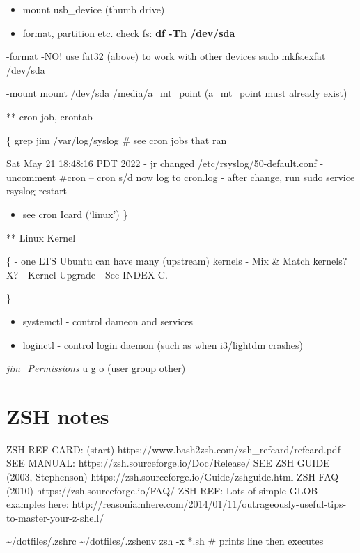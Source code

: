 \documentclass[
]{report}
\providecommand{\tightlist}{%
  \setlength{\itemsep}{0pt}\setlength{\parskip}{0pt}}\usepackage{longtable,booktabs,array}
\begin{document}
\begin{itemize}
\tightlist
\item
  mount usb\_device (thumb drive)
\item
  format, partition etc. check fs: \textbf{df -Th /dev/sda}
\end{itemize}

-format -NO! use fat32 (above) to work with other devices sudo
mkfs.exfat /dev/sda

-mount mount /dev/sda /media/a\_mt\_point (a\_mt\_point must already
exist)

** cron job, crontab

\{ grep jim /var/log/syslog \# see cron jobs that ran

Sat May 21 18:48:16 PDT 2022 - jr changed /etc/rsyslog/50-default.conf -
uncomment \#cron -- cron s/d now log to cron.log - after change, run
sudo service rsyslog restart

\begin{itemize}
\tightlist
\item
  see cron Icard (`linux') \}
\end{itemize}

** Linux Kernel

\{ - one LTS Ubuntu can have many (upstream) kernels - Mix \& Match
kernels? X? - Kernel Upgrade - See INDEX C.

\}

\begin{itemize}
\tightlist
\item
  systemctl - control dameon and services
\item
  loginctl - control login daemon (such as when i3/lightdm crashes)
\end{itemize}

\emph{jim\_Permissions} u g o (user group other)

\section{ZSH notes}\label{zsh-notes}

ZSH REF CARD: (start) https://www.bash2zsh.com/zsh\_refcard/refcard.pdf
SEE MANUAL: https://zsh.sourceforge.io/Doc/Release/ SEE ZSH GUIDE (2003,
Stephenson) https://zsh.sourceforge.io/Guide/zshguide.html ZSH FAQ
(2010) https://zsh.sourceforge.io/FAQ/ ZSH REF: Lots of simple GLOB
examples here:
http://reasoniamhere.com/2014/01/11/outrageously-useful-tips-to-master-your-z-shell/

\textasciitilde/dotfiles/.zshrc \textasciitilde/dotfiles/.zshenv zsh -x
*.sh \# prints line then executes
\end{document}
